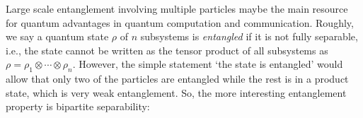 \documentclass[
aps,
pra,
twocolumn,
floatfix,
]{revtex4-2}
\theoremstyle{plain}
\theoremstyle{definition}
\newtheorem{definition}{Definition}
\newcommand{\dm}{\rho}
\newcommand{\separable}{\mathcal{S}}
\newcommand{\ppartition}{\mathcal{P}}
\begin{document}
Large scale entanglement involving multiple particles maybe the main resource for quantum advantages in quantum computation and communication.
Roughly, we say a quantum state $\dm$ of $n$ subsystems is \emph{entangled} if it is not fully separable,
i.e., the state cannot be written as the tensor product of all subsystems as $\dm=\rho_1\otimes\cdots\otimes\rho_n$.
However, the simple statement `the state is entangled' would allow that only two of the particles are entangled while the rest is in a product state, which is very weak entanglement.
So, the more interesting entanglement property is bipartite separability:
\end{document}
